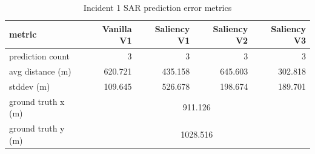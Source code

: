 \begin{table}[ht]
\centering
\caption{Incident 1 SAR prediction error metrics}
\label{tab:sar-incident-1}
\begin{tabular}{lrrrr}
\hline
metric & Vanilla V1 & Saliency V1 & Saliency V2 & Saliency V3 \\
\hline
prediction count & 3 & 3 & 3 & 3 \\
avg distance (m) & 620.721 & 435.158 & 645.603 & 302.818 \\
stddev (m) & 109.645 & 526.678 & 198.674 & 189.701 \\
ground truth x (m) & \multicolumn{4}{c}{911.126} \\
ground truth y (m) & \multicolumn{4}{c}{1028.516} \\
\hline
\end{tabular}
\end{table}
